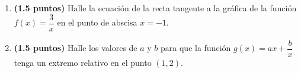
\begin{enumerate}[label=\alph*)]
\item \textbf{(1.5 puntos)} Halle la ecuación de la recta tangente a la gráfica de la función $f(x)=\dfrac{3}{x}$ en el punto de abscisa $x=-1$.
\item \textbf{(1.5 puntos)} Halle los valores de $a$ y $b$ para que la función $g(x)=ax+\dfrac{b}{x}$ tenga un extremo relativo en el punto $(1,2)$.
\end{enumerate}
